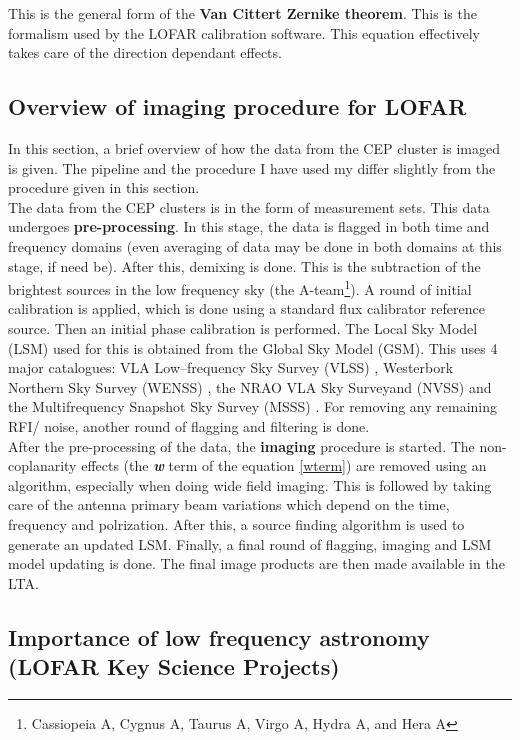 \documentclass[../main/thesis_msc.tex]{subfiles}
\begin{document}
\noindent This is the general form of the \textbf{Van Cittert Zernike theorem}. This is the formalism used by the LOFAR calibration software. This equation effectively takes care of the direction dependant effects. 


\subsection{Overview of imaging procedure for LOFAR}
\label{sec:sky_model}
In this section, a brief overview of how the data from the CEP cluster is imaged is given. The pipeline and the procedure I have used my differ slightly from the procedure given in this section. \\

\noindent The data from the CEP clusters is in the form of measurement sets. This data undergoes \textbf{pre-processing}. In this stage, the data is flagged in both time and frequency domains (even averaging of data may be done in both domains at this stage, if need be). After this, demixing is done. This is the subtraction of the brightest sources in the low frequency sky (the A-team\footnote{Cassiopeia A, Cygnus A, Taurus A, Virgo A, Hydra A, and Hera A}). A round of initial calibration is applied, which is done using a standard flux calibrator reference source. Then an initial phase calibration is performed. The Local Sky Model (LSM) used for this is obtained from the Global Sky Model (GSM). This uses 4 major catalogues: VLA Low--frequency Sky Survey (VLSS) \citep{vlss2}, Westerbork Northern Sky Survey (WENSS) \citep{wenss}, the NRAO VLA Sky Surveyand (NVSS) \citep{nvss} and the Multifrequency Snapshot Sky Survey (MSSS) \citep{msss}. For removing any remaining RFI/ noise, another round of flagging and filtering is done. \\
After the pre-processing of the data, the \textbf{imaging} procedure is started. The non-coplanarity effects (the \textit{\textbf{w}} term of the equation \ref{wterm}) are removed using an algorithm, especially when doing wide field imaging. This is followed by taking care of the antenna primary beam variations which depend on the time, frequency and polrization. After this, a source finding algorithm is used to generate an updated LSM. Finally, a final round of flagging, imaging and LSM model updating is done. The final image products are then made available in the LTA.\\

\subsection{Importance of low frequency astronomy (LOFAR Key Science Projects)}
\end{document}
